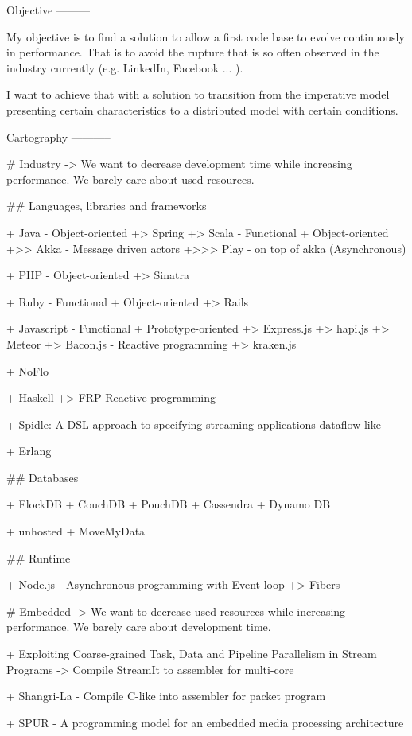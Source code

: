 Objective
---------

My objective is to find a solution to allow a first code base to evolve continuously in performance. That is to avoid the rupture that is so often observed in the industry currently (e.g. LinkedIn, Facebook ... ).

I want to achieve that with a solution to transition from the imperative model presenting certain characteristics to a distributed model with certain conditions.

Cartography
-----------


# Industry -> We want to decrease development time while increasing performance. We barely care about used resources.

## Languages, libraries and frameworks

  + Java - Object-oriented
  +> Spring
  +> Scala - Functional + Object-oriented
  +>> Akka - Message driven actors
  +>>> Play - on top of akka (Asynchronous)

  + PHP - Object-oriented
  +> Sinatra

  + Ruby - Functional + Object-oriented
  +> Rails

  + Javascript - Functional + Prototype-oriented
  +> Express.js
  +> hapi.js
  +> Meteor
  +> Bacon.js - Reactive programming
  +> kraken.js

  + NoFlo

  + Haskell
  +> FRP Reactive programming

  + Spidle: A DSL approach to specifying streaming applications dataflow like

  + Erlang

## Databases

  + FlockDB
  + CouchDB
  + PouchDB
  + Cassendra
  + Dynamo DB

  + unhosted
  + MoveMyData

## Runtime

  + Node.js - Asynchronous programming with Event-loop
  +> Fibers 


# Embedded -> We want to decrease used resources while increasing performance. We barely care about development time.



+ Exploiting Coarse-grained Task, Data and Pipeline Parallelism in Stream Programs -> Compile StreamIt to assembler for multi-core

+ Shangri-La - Compile C-like into assembler for packet program

+ SPUR - A programming model for an embedded media processing architecture


